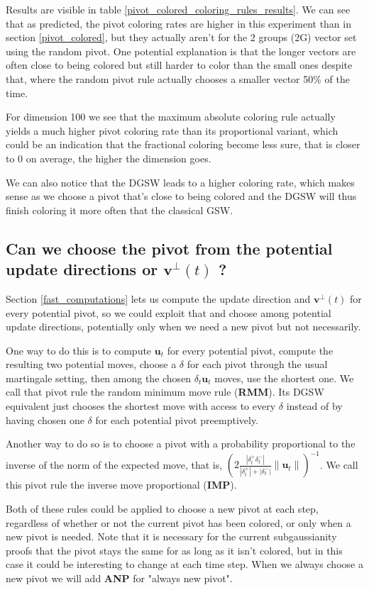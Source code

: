 \documentclass[12pt]{article}
\begin{document}
Results are visible in table \ref{pivot_colored_coloring_rules_results}. We can see that as predicted, the pivot coloring rates are higher in this experiment than in section \ref{pivot_colored}, but they actually aren't for the 2 groups (2G) vector set using the random pivot. One potential explanation is that the longer vectors are often close to being colored but still harder to color than the small ones despite that, where the random pivot rule actually chooses a smaller vector 50\% of the time. 

For dimension 100 we see that the maximum absolute coloring rule actually yields a much higher pivot coloring rate than its proportional variant, which could be an indication that the fractional coloring become less sure, that is closer to 0 on average, the higher the dimension goes.

We can also notice that the DGSW leads to a higher coloring rate, which makes sense as we choose a pivot that's close to being colored and the DGSW will thus finish coloring it more often that the classical GSW.

\subsection{Can we choose the pivot from the potential update directions or $\textbf{v}^\perp(t)$ ?}\label{pivot_from_v_perp}
Section \ref{fast_computations} lets us compute the update direction and $\textbf{v}^\perp(t)$ for every potential pivot, so we could exploit that and choose among potential update directions, potentially only when we need a new pivot but not necessarily. 

One way to do this is to compute $\textbf{u}_t$ for every potential pivot, compute the resulting two potential moves, choose a $\delta$ for each pivot through the usual martingale setting, then among the chosen $\delta_t\textbf{u}_t$ moves, use the shortest one. We call that pivot rule the random minimum move rule (\textbf{RMM}). Its DGSW equivalent just chooses the shortest move with access to every $\delta$ instead of by having chosen one $\delta$ for each potential pivot preemptively. 

Another way to do so is to choose a pivot with a probability proportional to the inverse of the norm of the expected move, that is, $(2\frac{|\delta_t^+\delta_t^-|}{|\delta_t^+|+|\delta_t^-|}\|\textbf{u}_t\|)^{-1}$. We call this pivot rule the inverse move proportional (\textbf{IMP}).

Both of these rules could be applied to choose a new pivot at each step, regardless of whether or not the current pivot has been colored, or only when a new pivot is needed. Note that it is necessary for the current subgaussianity proofs that the pivot stays the same for as long as it isn't colored, but in this case it could be interesting to change at each time step. When we always choose a new pivot we will add \textbf{ANP} for "always new pivot".
\end{document}
